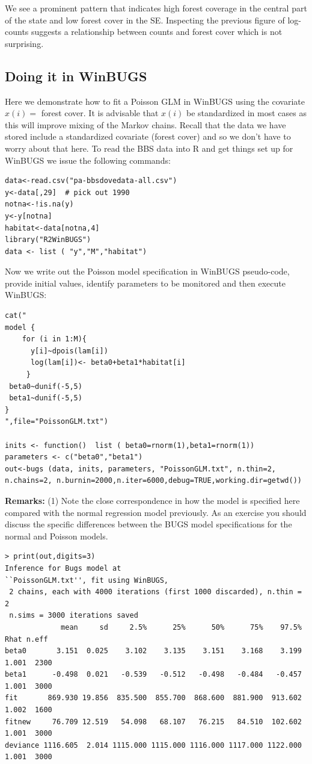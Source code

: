 We see a prominent pattern that indicates high forest coverage in the
central part of the state and low forest cover in the SE.  Inspecting
the previous figure of log-counts suggests a relationship between
counts and forest cover which is not surprising.

\subsection{Doing it in WinBUGS}
Here we demonstrate how to fit a Poisson GLM in WinBUGS using the covariate $x(i) =$ forest cover. It is advisable that $x(i)$ be standardized in most cases as this will improve mixing of the Markov chains. Recall that the data we have stored include a standardized covariate (forest cover) and so we don't have to worry about that here.  To read the BBS data into R and get things set up for WinBUGS we issue the following commands: 
\begin{verbatim}
data<-read.csv("pa-bbsdovedata-all.csv")
y<-data[,29]  # pick out 1990
notna<-!is.na(y)
y<-y[notna]
habitat<-data[notna,4]
library("R2WinBUGS")
data <- list ( "y","M","habitat")
\end{verbatim}
Now we write out the Poisson model specification in WinBUGS pseudo-code, provide initial values, identify parameters to be monitored and then execute WinBUGS:
\begin{verbatim}
cat("
model {
    for (i in 1:M){
      y[i]~dpois(lam[i])
      log(lam[i])<- beta0+beta1*habitat[i]
     }
 beta0~dunif(-5,5)
 beta1~dunif(-5,5)
}
",file="PoissonGLM.txt")

inits <- function()  list ( beta0=rnorm(1),beta1=rnorm(1))
parameters <- c("beta0","beta1")
out<-bugs (data, inits, parameters, "PoissonGLM.txt", n.thin=2, n.chains=2, n.burnin=2000,n.iter=6000,debug=TRUE,working.dir=getwd())
\end{verbatim}

{\bf Remarks:} (1) Note the close correspondence in how the model is specified here compared with the normal regression model previously. As an exercise you should discuss the specific differences between the BUGS model specifications for the normal and Poisson models.
\begin{verbatim}
> print(out,digits=3)
Inference for Bugs model at 
``PoissonGLM.txt'', fit using WinBUGS,
 2 chains, each with 4000 iterations (first 1000 discarded), n.thin = 2
 n.sims = 3000 iterations saved
             mean     sd     2.5%      25%      50%      75%    97.5%  Rhat n.eff
beta0       3.151  0.025    3.102    3.135    3.151    3.168    3.199 1.001  2300
beta1      -0.498  0.021   -0.539   -0.512   -0.498   -0.484   -0.457 1.001  3000
fit       869.930 19.856  835.500  855.700  868.600  881.900  913.602 1.002  1600
fitnew     76.709 12.519   54.098   68.107   76.215   84.510  102.602 1.001  3000
deviance 1116.605  2.014 1115.000 1115.000 1116.000 1117.000 1122.000
1.001  3000
\end{verbatim}


